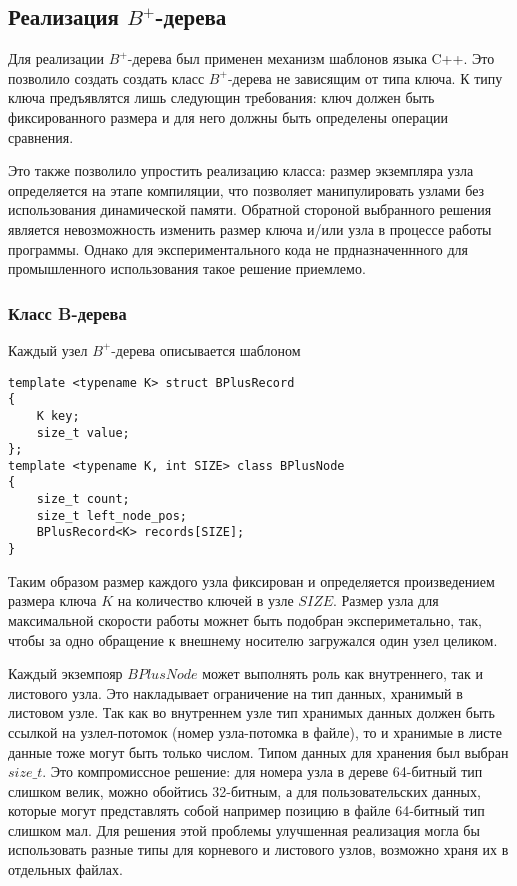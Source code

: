 \documentclass[14pt, russian]{scrartcl}
\begin{document}
\subsection{Реализация $B^+$-дерева}

Для реализации $B^+$-дерева был применен механизм шаблонов языка C++. Это позволило создать создать класс 
$B^+$-дерева не зависящим от типа ключа. К типу ключа предъявлятся лишь следующин требования: ключ должен быть фиксированного размера и для него должны быть определены операции сравнения.

Это также позволило упростить реализацию класса: размер экземпляра узла определяется на этапе компиляции, что позволяет манипулировать узлами без использования динамической памяти. Обратной стороной выбранного решения является невозможность изменить размер ключа и/или узла в процессе работы программы. Однако для экспериментального кода не прдназначеннного для промышленного использования такое решение приемлемо. 

\subsubsection{Класс B-дерева}

Каждый узел $B^+$-дерева описывается шаблоном 

\begin{verbatim}
template <typename K> struct BPlusRecord
{
    K key;
    size_t value;
};
template <typename K, int SIZE> class BPlusNode
{
    size_t count;
    size_t left_node_pos;
    BPlusRecord<K> records[SIZE];
}
\end{verbatim}

Таким образом размер каждого узла фиксирован и определяется произведением размера ключа $K$ на количество
ключей в узле $SIZE$. Размер узла для максимальной скорости работы можнет быть подобран экспериметально, так, чтобы за одно обращение к внешнему носителю загружался один узел целиком.

Каждый экземпояр $BPlusNode$ может выполнять роль как внутреннего, так и листового узла. Это накладывает ограничение
на тип данных, хранимый в листовом узле. Так как во внутреннем узле тип хранимых данных должен быть ссылкой на узлел-потомок (номер узла-потомка в файле), то и хранимые в листе данные тоже могут быть только числом. Типом данных для хранения был выбран $size\_t$. Это компромиссное решение: для номера узла в дереве 64-битный тип слишком велик, можно обойтись 32-битным, а для пользовательских данных, которые могут представлять собой например позицию в файле 64-битный тип слишком мал. Для решения этой проблемы улучшенная реализация могла бы использовать разные типы для корневого и листового узлов, возможно храня их в отдельных файлах.
\end{document}
